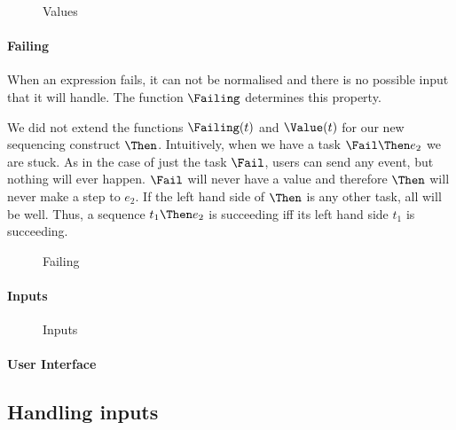 \begin{figure}[h]
  \small
  \caption{Values} \label{fig:observation-value}
\end{figure}



\paragraph{Failing}

When an expression fails, it can not be normalised and there is no possible
input that it will handle. The function $\Failing$ determines this property.

We did not extend the functions $\Failing(t)$ and $\Value(t)$ for our new sequencing construct $\Then$.
Intuitively,
when we have a task $\Fail \Then e_2$ we are stuck.
As in the case of just the task $\Fail$,
users can send any event,
but nothing will ever happen.
$\Fail$ will never have a value
and therefore $\Then$ will never make a step to $e_2$.
If the left hand side of $\Then$ is any other task,
all will be well.
Thus,
a sequence $t_1 \Then e_2$ is succeeding iff its left hand side $t_1$ is succeeding.

\begin{figure}[h]
  \small
  \caption{Failing} \label{fig:observation-failing}
\end{figure}



\paragraph{Inputs}


\begin{figure}[h]
  \small
  \caption{Inputs} \label{fig:observation-value}
\end{figure}



\paragraph{User Interface}




\subsection{Handling inputs}
\label{sec:handling}

